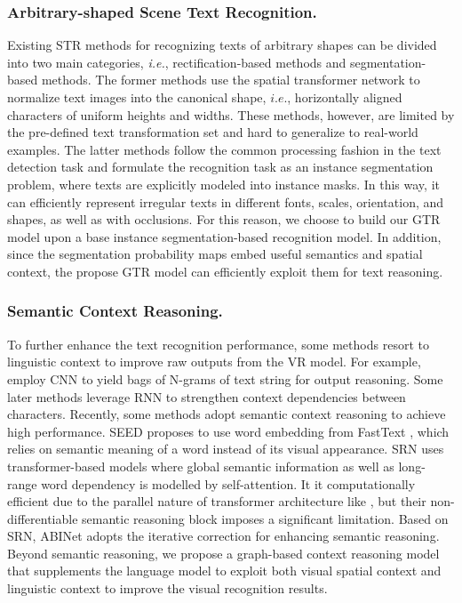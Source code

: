 \documentclass[letterpaper]{article} \usepackage{aaai22}  \usepackage{times}  \usepackage{helvet}  \usepackage{courier}  \usepackage[hyphens]{url}  \usepackage{graphicx} \urlstyle{rm} \def\UrlFont{\rm}  \usepackage{natbib}  \usepackage{caption} \DeclareCaptionStyle{ruled}{labelfont=normalfont,labelsep=colon,strut=off} \frenchspacing  \setlength{\pdfpagewidth}{8.5in}  \setlength{\pdfpageheight}{11in}
\newcommand{\bt}{\color{black}}
\begin{document}
\subsubsection{Arbitrary-shaped Scene Text Recognition.} 
Existing STR methods for recognizing texts of arbitrary shapes can be divided into two main categories, \textit{i.e.}, rectification-based methods and segmentation-based methods. The former methods \cite{gao2018recurrent, yang2017learning, cheng2018aon} use the spatial transformer network \cite{jaderberg2015spatial} to normalize text images into the canonical shape, $i.e.$, horizontally aligned characters of uniform heights and widths. These methods, however, are limited by the pre-defined text transformation set and hard to generalize to real-world examples. The latter methods \cite{liao2019scene,wan2020textscanner} {\bt follow the common processing fashion in the text detection task \cite{ye2021i3cl} and } formulate the recognition task as an instance segmentation problem, where texts are explicitly modeled into instance masks. In this way, it can efficiently represent irregular texts in different fonts, scales, orientation, and shapes, as well as with occlusions. For this reason, we choose to build our GTR model upon a base instance segmentation-based recognition model. In addition, since the segmentation probability maps embed useful semantics and spatial context, the propose GTR model can efficiently exploit them for text reasoning.



\subsubsection{Semantic Context Reasoning.}
To further enhance the text recognition performance, some methods resort to linguistic context to improve raw outputs from the VR model. For example, \cite{cheng2017focusing}
employ {\bt CNN} to yield bags of N-grams of text string for output reasoning. 
Some later methods \cite{Wang2020DecoupledAN,wojna2017attention} leverage {\bt RNN} to strengthen context dependencies between characters.
Recently, some methods adopt semantic context reasoning to achieve high performance. SEED \cite{qiao2020seed} proposes to use word embedding from FastText \cite{bojanowski2017enriching}, which relies on semantic meaning of a word instead of its visual appearance.
SRN \cite{yu2020towards} uses transformer-based models where global semantic information as well as long-range word dependency is modelled by self-attention. It it computationally efficient due to the parallel nature of transformer architecture {\bt like \cite{xu2021vitae}}, but their non-differentiable semantic reasoning block imposes a significant limitation. 
{\bt Based on SRN, ABINet \cite{fang2021read} adopts the iterative correction for enhancing semantic reasoning.}  
Beyond semantic reasoning, we propose a graph-based context reasoning model that supplements the language model to exploit both visual spatial context and linguistic context to improve the visual recognition results.
\end{document}
